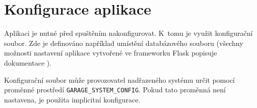 
\section{Konfigurace aplikace}
\label{sec:im_config}

Aplikaci je nutné před spuštěním nakonfigurovat. K~tomu je využit konfigurační soubor. Zde je definováno například umístění databázového souboru (všechny možnosti nastavení aplikace vytvořené ve frameworku Flask popisuje dokumentace \cite{flask_config}).

Konfigurační soubor může provozovatel nadřazeného systému určit pomocí proměnné prostředí \texttt{GARAGE\_SYSTEM\_CONFIG}. Pokud tato proměnná není nastavena, je použita implicitní konfigurace.